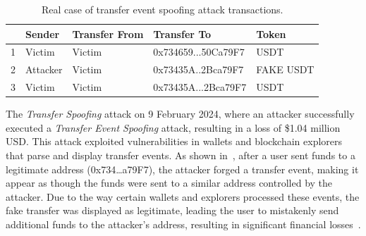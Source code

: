 \begin{table}[]
\caption{Real case of transfer event spoofing attack transactions.}
\label{tab:transfer_spoof_attack_transaction}
\begin{tabular}{lllll}
\toprule
  & Sender & Transfer From                & Transfer To                  & Token      \\
\midrule
1 & Victim           & Victim & 0x{\color[HTML]{FE0000}734}659...50C{\color[HTML]{FE0000}a79F7} & USDT \\
\midrule
2 & Attacker              & Victim & 0x{\color[HTML]{FE0000}734}35A..2Bc{\color[HTML]{FE0000}a79F7}  & FAKE USDT     \\
\midrule
3 & Victim           & Victim & 0x{\color[HTML]{FE0000}734}35A...2Bc{\color[HTML]{FE0000}a79F7} & USDT \\
\bottomrule
\end{tabular}
\end{table}
The \emph{Transfer Spoofing} attack on 9 February 2024, where an attacker successfully executed a \emph{Transfer Event Spoofing} attack, resulting in a loss of \$1.04 million USD. This attack exploited vulnerabilities in wallets and blockchain explorers that parse and display transfer events. As shown in~, after a user sent funds to a legitimate address (0x734\ldots{}a79F7), the attacker forged a transfer event, making it appear as though the funds were sent to a similar address controlled by the attacker. Due to the way certain wallets and explorers processed these events, the fake transfer was displayed as legitimate, leading the user to mistakenly send additional funds to the attacker's address, resulting in significant financial losses~\cite{zero_transfer}.